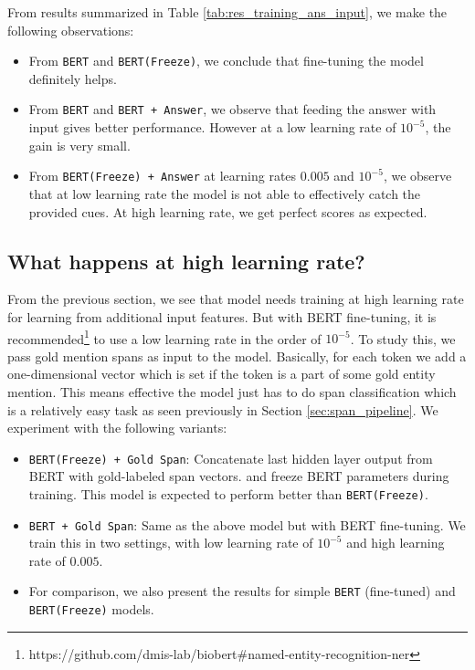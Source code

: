From results summarized in Table \ref{tab:res_training_ans_input}, we make the following observations:
\begin{itemize}
    \item From \texttt{BERT} and \texttt{BERT(Freeze)}, we conclude that fine-tuning the model definitely helps.
    
    \item From \texttt{BERT} and \texttt{BERT + Answer}, we observe that feeding the answer with input gives better performance. However at a low learning rate of $10^{-5}$, the gain is very small.
    
    \item From \texttt{BERT(Freeze) + Answer} at learning rates $0.005$ and $10^{-5}$, we observe that at low learning rate the model is not able to effectively catch the provided cues. At high learning rate, we get perfect scores as expected.
\end{itemize}

\subsection{What happens at high learning rate?}
From the previous section, we see that model needs training at high learning rate for learning from additional input features. But with BERT fine-tuning, it is recommended\footnote{https://github.com/dmis-lab/biobert\#named-entity-recognition-ner} to use a low learning rate in the order of $10^{-5}$. To study this, we pass gold mention spans as input to the model. Basically, for each token we add a one-dimensional vector which is set if the token is a part of some gold entity mention. This means effective the model just has to do span classification which is a relatively easy task as seen previously in Section \ref{sec:span_pipeline}. We experiment with the following variants:

\begin{itemize}
    \item \texttt{BERT(Freeze) + Gold Span}: Concatenate last hidden layer output from BERT with gold-labeled span vectors. and freeze BERT parameters during training. This model is expected to perform better than \texttt{BERT(Freeze)}.
    
    \item \texttt{BERT + Gold Span}: Same as the above model but with BERT fine-tuning. We train this in two settings, with low learning rate of $10^{-5}$ and high learning rate of $0.005$.
    
    \item For comparison, we also present the results for simple \texttt{BERT} (fine-tuned) and \texttt{BERT(Freeze)} models.
\end{itemize}

